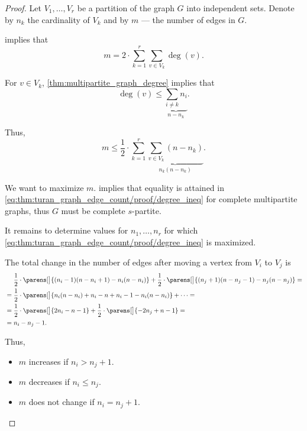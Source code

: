 \begin{proof}
  Let \( V_1, \ldots, V_r \) be a partition of the graph \( G \) into independent sets. Denote by \( n_k \) the cardinality of \( V_k \) and by \( m \) --- the number of edges in \( G \).

   implies that
  \begin{equation*}
    m = 2 \cdot \sum_{k=1}^r \sum_{v \in V_k} \deg(v).
  \end{equation*}

  For \( v \in V_k \), \cref{thm:multipartite_graph_degree} implies that
  \begin{equation*}
    \deg(v) \leq \underbrace{\sum_{i \neq k} n_i}_{n - n_k}.
  \end{equation*}

  Thus,
  \begin{equation}\label{eq:thm:turan_graph_edge_count/proof/degree_ineq}
    m \leq \frac 1 2 \cdot \sum_{k=1}^r \underbrace{\sum_{v \in V_k} (n - n_k)}_{n_k (n - n_k)}.
  \end{equation}

  We want to maximize \( m \).  implies that equality is attained in \eqref{eq:thm:turan_graph_edge_count/proof/degree_ineq} for complete multipartite graphs, thus \( G \) must be complete \( s \)-partite.

  It remains to determine values for \( n_1, \ldots, n_r \) for which \eqref{eq:thm:turan_graph_edge_count/proof/degree_ineq} is maximized.

  The total change in the number of edges after moving a vertex from \( V_i \) to \( V_j \) is
  \begin{align*}
    &\phantom{{}={}}
    \frac 1 2 \cdot \parens[\big]{ (n_i - 1)(n - n_i + 1) - n_i(n - n_i) } + \frac 1 2 \cdot \parens[\big]{ (n_j + 1)(n - n_j - 1) - n_j(n - n_j) }
    = \\ &=
    \frac 1 2 \cdot \parens[\big]{ n_i(n - n_i) + n_i - n + n_i - 1 - n_i(n - n_i) } + \cdots
    = \\ &=
    \frac 1 2 \cdot \parens[\big]{ 2n_i - n - 1 } + \frac 1 2 \cdot \parens[\big]{ -2n_j + n - 1 }
    = \\ &=
    n_i - n_j - 1.
  \end{align*}

  Thus,
  \begin{itemize}
    \item \( m \) increases if \( n_i > n_j + 1 \).
    \item \( m \) decreases if \( n_i \leq n_j \).
    \item \( m \) does not change if \( n_i = n_j + 1 \).
  \end{itemize}


\end{proof}
